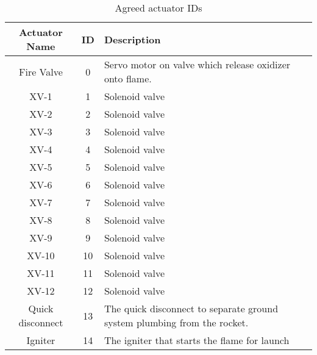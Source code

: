 \begin{table}
    \centering
    \begin{tabular}{| c | c | p{3in} |}
        \hline
        Actuator Name    & ID & Description                                                              \\
        \hline
        Fire Valve       & 0  & Servo motor on valve which release oxidizer onto flame.                  \\
        \hline
        XV-1             & 1  & Solenoid valve                                                           \\
        \hline
        XV-2             & 2  & Solenoid valve                                                           \\
        \hline
        XV-3             & 3  & Solenoid valve                                                           \\
        \hline
        XV-4             & 4  & Solenoid valve                                                           \\
        \hline
        XV-5             & 5  & Solenoid valve                                                           \\
        \hline
        XV-6             & 6  & Solenoid valve                                                           \\
        \hline
        XV-7             & 7  & Solenoid valve                                                           \\
        \hline
        XV-8             & 8  & Solenoid valve                                                           \\
        \hline
        XV-9             & 9  & Solenoid valve                                                           \\
        \hline
        XV-10            & 10 & Solenoid valve                                                           \\
        \hline
        XV-11            & 11 & Solenoid valve                                                           \\
        \hline
        XV-12            & 12 & Solenoid valve                                                           \\
        \hline
        Quick disconnect & 13 & The quick disconnect to separate ground system plumbing from the rocket. \\
        \hline
        Igniter          & 14 & The igniter that starts the flame for launch                             \\
        \hline
    \end{tabular}
    \caption{Agreed actuator IDs}
    \label{tbl:act-ids}
\end{table}

